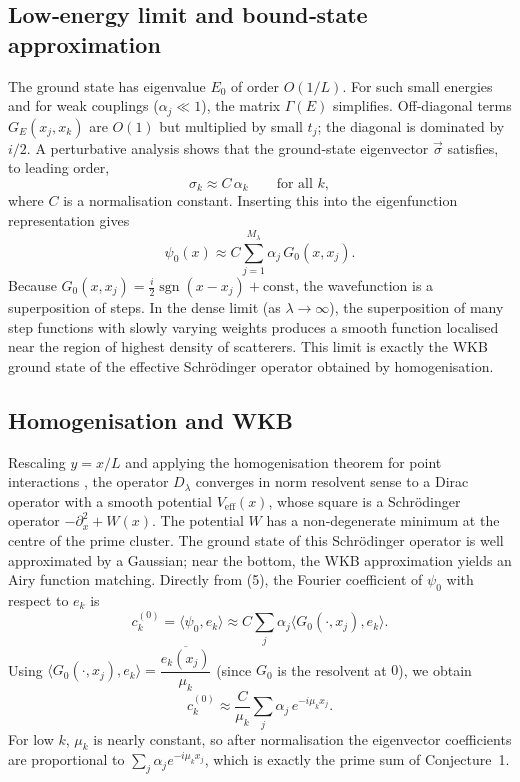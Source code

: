 \documentclass[12pt,a4paper]{article}
\newcommand{\sgn}{\operatorname{sgn}}
\begin{document}
\subsection{Low‑energy limit and bound‑state approximation}
The ground state has eigenvalue $E_0$ of order $O(1/L)$.  For such small energies and for weak couplings ($\alpha_j\ll1$), the matrix $\Gamma(E)$ simplifies.  Off‑diagonal terms $G_E(x_j,x_k)$ are $O(1)$ but multiplied by small $t_j$; the diagonal is dominated by $i/2$.  A perturbative analysis shows that the ground‑state eigenvector $\vec{\sigma}$ satisfies, to leading order,
\[
\sigma_k \approx C\, \alpha_k \qquad\text{for all } k,
\]
where $C$ is a normalisation constant.  Inserting this into the eigenfunction representation gives
\[
\psi_0(x) \approx C \sum_{j=1}^{M_\lambda} \alpha_j \, G_0(x,x_j).
\tag{5}
\]
Because $G_0(x,x_j) = \frac{i}{2}\sgn(x-x_j) + \text{const}$, the wavefunction is a superposition of steps.  In the dense limit (as $\lambda\to\infty$), the superposition of many step functions with slowly varying weights produces a smooth function localised near the region of highest density of scatterers.  This limit is exactly the WKB ground state of the effective Schrödinger operator obtained by homogenisation.

\subsection{Homogenisation and WKB}
Rescaling $y = x/L$ and applying the homogenisation theorem for point interactions \cite{Albeverio1988}, the operator $D_\lambda$ converges in norm resolvent sense to a Dirac operator with a smooth potential $V_{\text{eff}}(x)$, whose square is a Schrödinger operator $-\partial_x^2 + W(x)$.  The potential $W$ has a non‑degenerate minimum at the centre of the prime cluster.  The ground state of this Schrödinger operator is well approximated by a Gaussian; near the bottom, the WKB approximation yields an Airy function matching.  Directly from (5), the Fourier coefficient of $\psi_0$ with respect to $e_k$ is
\[
c_k^{(0)} = \langle\psi_0, e_k\rangle \approx C \sum_{j} \alpha_j \langle G_0(\cdot,x_j), e_k\rangle.
\]
Using $\langle G_0(\cdot,x_j), e_k\rangle = \dfrac{\overline{e_k(x_j)}}{\mu_k}$ (since $G_0$ is the resolvent at $0$), we obtain
\[
c_k^{(0)} \approx \frac{C}{\mu_k} \sum_{j} \alpha_j \, e^{-i\mu_k x_j}.
\]
For low $k$, $\mu_k$ is nearly constant, so after normalisation the eigenvector coefficients are proportional to $\sum_j \alpha_j e^{-i\mu_k x_j}$, which is exactly the prime sum of Conjecture~1.
\end{document}
